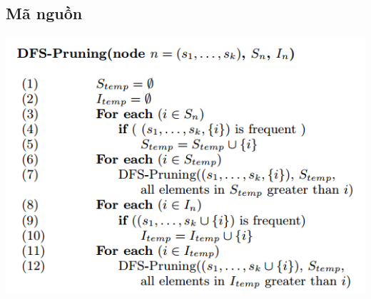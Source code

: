 \documentclass[a4paper 14pt]{article}
\begin{document}
		\subsection{Mã nguồn}
			\includegraphics[scale = 0.6]{spam}
\end{document}
